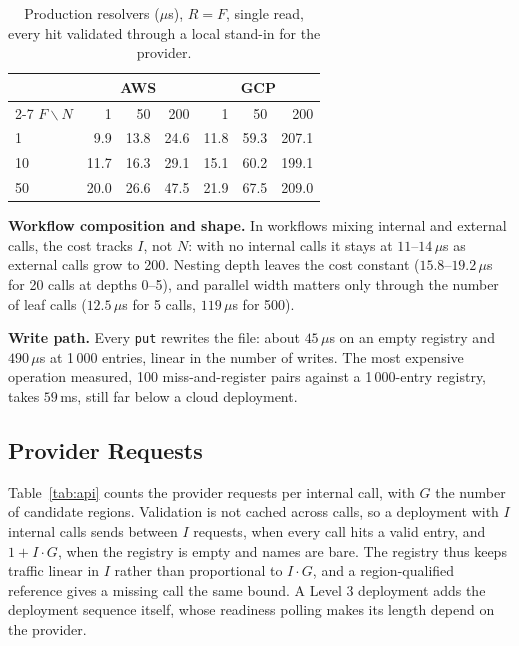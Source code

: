 \documentclass[conference]{IEEEtran}
\begin{document}
\begin{table}[t]
  \centering
  \caption{Production resolvers ($\mu$s), $R{=}F$, single read, every hit validated through a local
  stand-in for the provider.}
  \label{tab:t67}
  \footnotesize
  \setlength{\tabcolsep}{4pt}
  \begin{tabular}{|l|r|r|r|r|r|r|}
    \hline
     & \multicolumn{3}{c|}{\textbf{AWS}} & \multicolumn{3}{c|}{\textbf{GCP}} \\
    \cline{2-7}
    $F\backslash N$ & 1 & 50 & 200 & 1 & 50 & 200 \\
    \hline
    1  & 9.9  & 13.8 & 24.6 & 11.8 & 59.3 & 207.1 \\
    \hline
    10 & 11.7 & 16.3 & 29.1 & 15.1 & 60.2 & 199.1 \\
    \hline
    50 & 20.0 & 26.6 & 47.5 & 21.9 & 67.5 & 209.0 \\
    \hline
  \end{tabular}
\end{table}

\textbf{Workflow composition and shape.} In workflows mixing internal and external calls, the cost
tracks $I$, not $N$: with no internal calls it stays at $11$--$14\,\mu$s as external calls grow to
200. Nesting depth leaves the cost constant ($15.8$--$19.2\,\mu$s for 20 calls at depths 0--5), and
parallel width matters only through the number of leaf calls ($12.5\,\mu$s for 5 calls,
$119\,\mu$s for 500).

\textbf{Write path.} Every \texttt{put} rewrites the file: about $45\,\mu$s on an empty registry
and $490\,\mu$s at 1\,000 entries, linear in the number of writes. The most expensive operation
measured, 100 miss-and-register pairs against a 1\,000-entry registry, takes $59$\,ms, still far
below a cloud deployment.

\subsection{Provider Requests}
Table~\ref{tab:api} counts the provider requests per internal call, with $G$ the number of
candidate regions. Validation is not cached across calls, so a deployment with $I$ internal calls
sends between $I$ requests, when every call hits a valid entry, and $1+I\cdot G$, when the registry
is empty and names are bare. The registry thus keeps traffic linear in $I$ rather than proportional
to $I\cdot G$, and a region-qualified reference gives a missing call the same bound. A Level 3
deployment adds the deployment sequence itself, whose readiness polling makes its length depend on
the provider.
\end{document}
